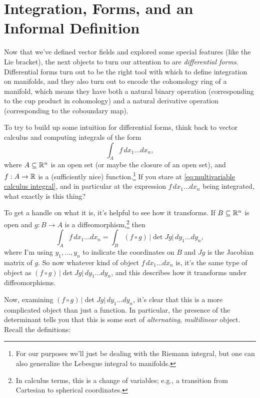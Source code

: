 
\section{Integration, Forms, and an Informal Definition}


Now that we've defined vector fields and explored some special features (like the Lie bracket), the next objects to turn our attention to are \emph{differential forms}. Differential forms turn out to be the right tool with which to define integration on manifolds, and they also turn out to encode the cohomology ring of a manifold, which means they have both a natural binary operation (corresponding to the cup product in cohomology) and a natural derivative operation (corresponding to the coboundary map).

To try to build up some intuition for differential forms, think back to vector calculus and computing integrals of the form
\begin{equation}\label{eq:multivariable calculus integral}
	\int_A f\, dx_1 \dots dx_n,
\end{equation}
where $A \subseteq \mathbb{R}^n$ is an open set (or maybe the closure of an open set), and $f: A \to \mathbb{R}$ is a (sufficiently nice) function.\footnote{For our purposes we'll just be dealing with the Riemann integral, but one can also generalize the Lebesgue integral to manifolds.} If you stare at \eqref{eq:multivariable calculus integral}, and in particular at the expression $f\, dx_1 \dots dx_n$ being integrated, what exactly is this thing?

To get a handle on what it is, it's helpful to see how it transforms. If $B \subseteq \mathbb{R}^n$ is open and $g: B \to A$ is a diffeomorphism,\footnote{In calculus terms, this is a change of variables; e.g., a transition from Cartesian to spherical coordinates.} then
\[
	\int_A f\, dx_1 \dots dx_n = \int_B (f \circ g) \,|\!\det Jg|\, dy_1 \dots dy_n,
\]
where I'm using $y_1, \dots , y_n$ to indicate the coordinates on $B$ and $Jg$ is the Jacobian matrix of $g$. So now whatever kind of object $f\, dx_1 \dots dx_n$ is, it's the same type of object as $(f \circ g) \,|\!\det Jg|\, dy_1 \dots dy_n$, and this describes how it transforms under diffeomorphisms.

Now, examining $(f \circ g)\, |\!\det Jg|\, dy_1 \dots dy_n$, it's clear that this is a more complicated object than just a function. In particular, the presence of the determinant tells you that this is some sort of \emph{alternating}, \emph{multilinear} object. Recall the definitions:


